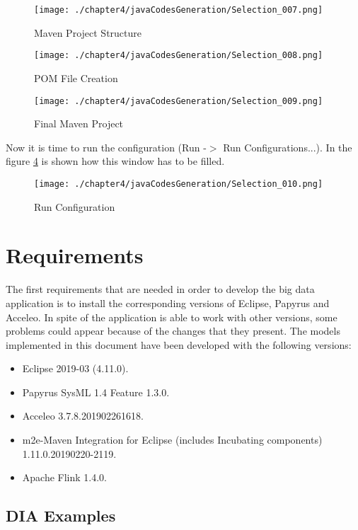 \begin{figure}
\centering
{\texttt{[image: ./chapter4/javaCodesGeneration/Selection\_007.png]}}
\caption{Maven Project Structure}
\label{fig:Maven Project Structure}
\end{figure}

\begin{figure}
\centering
{\texttt{[image: ./chapter4/javaCodesGeneration/Selection\_008.png]}}
\caption{POM File Creation}
\label{fig:POM File Creation}
\end{figure}

\begin{figure}
\centering
{\texttt{[image: ./chapter4/javaCodesGeneration/Selection\_009.png]}}
\caption{Final Maven Project}
\label{fig:Final Maven Project}
\end{figure}

Now it is time to run the configuration (Run -$>$ Run Configurations...). In the figure \ref{fig:Run Configuration} is shown how this window has to be filled.

\begin{figure}
\centering
{\texttt{[image: ./chapter4/javaCodesGeneration/Selection\_010.png]}}
\caption{Run Configuration}
\label{fig:Run Configuration}
\end{figure}

\section{Requirements}
The first requirements that are needed in order to develop the big data application is to install the corresponding versions of Eclipse, Papyrus and Acceleo. In spite of the application is able to work with other versions, some problems could appear because of the changes that they present. The models implemented in this document have been developed with the following versions:

\begin{itemize}
\item Eclipse 2019-03 (4.11.0).
\item Papyrus SysML 1.4 Feature	1.3.0.
\item Acceleo 3.7.8.201902261618.
\item m2e-Maven Integration for Eclipse (includes Incubating components) 1.11.0.20190220-2119.
\item Apache Flink 1.4.0.
\end{itemize}

\subsection{DIA Examples}

